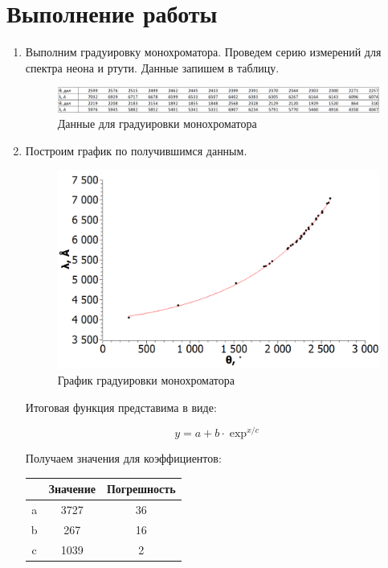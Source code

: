 \documentclass[a4paper, 12pt]{article}%
\begin{document}
\section{Выполнение работы}

\begin{enumerate}
\item Выполним градуировку монохроматора. Проведем серию измерений для спектра неона и ртути. Данные запишем в таблицу.

\begin{figure}[h!]
\centering
\includegraphics[width = \linewidth]{images/table.png}
\caption{Данные для градуировки монохроматора}
\label{mirror}
\end{figure}

\item Построим график по получившимся данным.

\begin{figure}[h!]
\centering
\includegraphics[width = 0.8\linewidth]{images/graph.png}
\caption{График градуировки монохроматора}
\label{mirror}
\end{figure}

Итоговая функция представима в виде:

\[y = a + b\cdot \exp^{x/c}\]

Получаем значения для коэффициентов:

\begin{center}
\begin{tabular}{|c|c|c|}
\hline 
 & Значение & Погрешность \\ 
\hline 
a & 3727 & 36 \\ 
\hline 
b & 267 & 16 \\ 
\hline 
c & 1039 & 2 \\ 
\hline 
\end{tabular} 
\end{center}


\end{enumerate}
\end{document}
